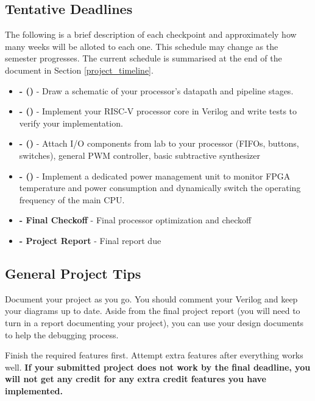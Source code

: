 \documentclass[11pt]{article}
\begin{document}
\subsection{Tentative Deadlines}
\label{tentative_deadlines}
The following is a brief description of each checkpoint and approximately how many weeks will be alloted to each one. This schedule may change as the semester progresses. The current schedule is summarised at the end of the document in Section \ref{project_timeline}.

\begin{itemize}
  \item \textbf{\blockDiagramDueDate \space - \blockDiagramTaskName \space (\blockDiagramTimeAlloted)} - Draw a schematic of your processor's datapath and pipeline stages.
  \item \textbf{\baseCPUDueDate \space - \baseCPUTaskName \space (\baseCPUTimeAlloted)} - Implement your RISC-V processor core in Verilog and write tests to verify your implementation.
  \item \textbf{\audioDueDate \space - \audioTaskName \space (\audioTimeAlloted)} - Attach I/O components from lab to your processor (FIFOs, buttons, switches), general PWM controller, basic subtractive synthesizer
  \item \textbf{\dfsDueDate \space - \dfsTaskName \space (\dfsTimeAlloted)} - Implement a dedicated power management unit to monitor FPGA temperature and power consumption and dynamically switch the operating frequency of the main CPU.
  \item \textbf{\finalCheckoffDueDate \space - Final Checkoff} - Final processor optimization and checkoff
  \item \textbf{\finalReportDueDate \space - Project Report} - Final report due
\end{itemize}

\subsection{General Project Tips}
\label{tips}
Document your project as you go.
You should comment your Verilog and keep your diagrams up to date.
Aside from the final project report (you will need to turn in a report documenting your project), you can use your design documents to help the debugging process.

Finish the required features first.
Attempt extra features after everything works well.
\textbf{If your submitted project does not work by the final deadline, you will not get any credit for any extra credit features you have implemented.}
\end{document}
